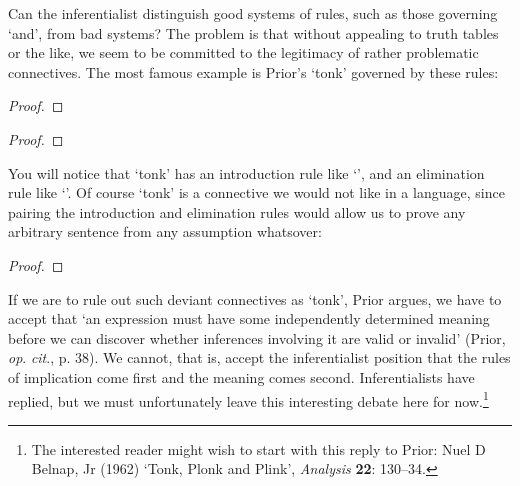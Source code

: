 Can the inferentialist distinguish good systems of rules, such as those governing `and', from bad systems? The problem is that without appealing to truth tables or the like, we seem to be committed to the legitimacy of rather problematic connectives. The most famous example is Prior's `tonk' governed by these rules:

\begin{minipage}{0.35\textwidth}
	\begin{proof}
		\have[\ ]{}{\vdots}
		 
	\end{proof}
\end{minipage}\qquad\begin{minipage}{0.35\textwidth}
	\begin{proof}
		\have[\ ]{}{\vdots}
		 
	\end{proof}
\end{minipage}

You will notice that `tonk' has an introduction rule like `\eor', and an elimination rule like `\eand'. Of course `tonk' is a connective we would not like in a language, since pairing the introduction and elimination rules would allow us to prove any arbitrary sentence from any assumption whatsover: \begin{proof}
\end{proof}

If we are to rule out such deviant connectives as `tonk', Prior argues, we have to accept that  `an expression must have some independently determined meaning before we can discover whether inferences involving it are valid or invalid' (Prior, \emph{op}. \emph{cit}., p. 38). We cannot, that is, accept the inferentialist position that the rules of implication come first and the meaning comes second. Inferentialists have replied, but we must unfortunately leave this interesting debate here for now.\footnote{The interested reader might wish to start with this reply to Prior: Nuel D Belnap, Jr (1962) `Tonk, Plonk and Plink', \emph{Analysis} \textbf{22}: 130–34.}



